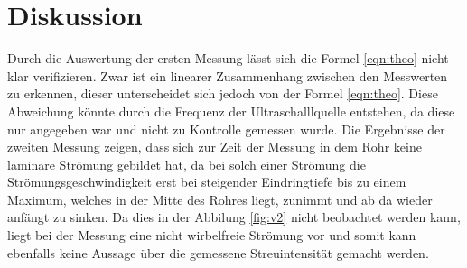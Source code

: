 \section{Diskussion}
\label{sec:Diskussion}
Durch die Auswertung der ersten Messung lässt sich die
Formel \eqref{eqn:theo} nicht klar verifizieren. Zwar ist ein linearer
Zusammenhang zwischen den Messwerten zu erkennen,
dieser unterscheidet sich
jedoch von der Formel \eqref{eqn:theo}. Diese Abweichung
könnte durch die Frequenz der Ultraschalllquelle entstehen, da diese
nur angegeben war und
nicht zu Kontrolle gemessen wurde.
Die Ergebnisse der zweiten Messung zeigen, dass sich zur Zeit der
Messung in dem Rohr keine laminare Strömung gebildet hat, da
bei solch einer Strömung die Strömungsgeschwindigkeit erst bei
steigender Eindringtiefe bis zu einem Maximum, welches in der Mitte des Rohres liegt,
zunimmt und ab da wieder anfängt zu sinken.
Da dies in der Abbilung \ref{fig:v2} nicht beobachtet werden kann, liegt bei
der Messung eine nicht wirbelfreie Strömung vor und somit kann ebenfalls
keine Aussage über die gemessene Streuintensität gemacht werden.
